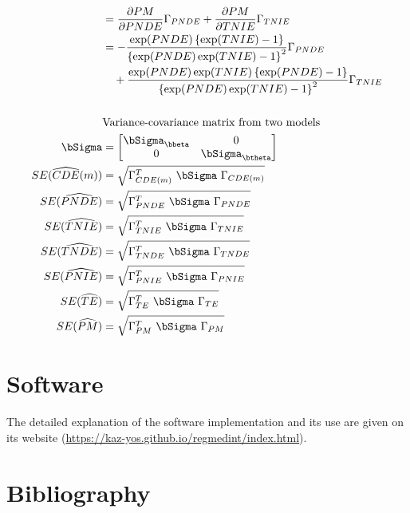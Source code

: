 \documentclass[dvipdfmx,10pt]{article}
\begin{document}
\begin{align*}
  &= \frac{\partial PM}{\partial PNDE}\Gamma_{PNDE} + \frac{\partial PM}{\partial TNIE}\Gamma_{TNIE}\\
  &= - \frac{\exp(PNDE)\left\{ \exp(TNIE) - 1 \right\}}{\left\{ \exp(PNDE)\exp(TNIE) - 1 \right\}^{2}} \Gamma_{PNDE}\\
  &~~~ + \frac{\exp(PNDE)\exp(TNIE)\left\{ \exp(PNDE) - 1 \right\}}{\left\{ \exp(PNDE)\exp(TNIE) - 1 \right\}^{2}} \Gamma_{TNIE}\\
  \\
  &\text{Variance-covariance matrix from two models}\\
  \bSigma &=
           \begin{bmatrix}
             \bSigma_{\bbeta} & 0 \\
             0 & \bSigma_{\btheta} \\
           \end{bmatrix}\\
  SE(\widehat{CDE}(m)) &= \sqrt{\Gamma_{CDE(m)}^{T} ~\bSigma~ \Gamma_{CDE(m)}}\\
  SE(\widehat{PNDE}) &= \sqrt{\Gamma_{PNDE}^{T} ~\bSigma~ \Gamma_{PNDE}}\\
  SE(\widehat{TNIE}) &= \sqrt{\Gamma_{TNIE}^{T} ~\bSigma~ \Gamma_{TNIE}}\\
  SE(\widehat{TNDE}) &= \sqrt{\Gamma_{TNDE}^{T} ~\bSigma~ \Gamma_{TNDE}}\\
  SE(\widehat{PNIE}) &= \sqrt{\Gamma_{PNIE}^{T} ~\bSigma~ \Gamma_{PNIE}}\\
  SE(\widehat{TE}) &= \sqrt{\Gamma_{TE}^{T} ~\bSigma~ \Gamma_{TE}}\\
  SE(\widehat{PM}) &= \sqrt{\Gamma_{PM}^{T} ~\bSigma~ \Gamma_{PM}}\\
\end{align*}


\section{Software}
\label{sec:orgd1db72e}
The detailed explanation of the software implementation and its use are given on its website (\url{https://kaz-yos.github.io/regmedint/index.html}).

\section{Bibliography}
\label{sec:org397e5e3}
\renewcommand{\section}[2]{}



\end{document}
